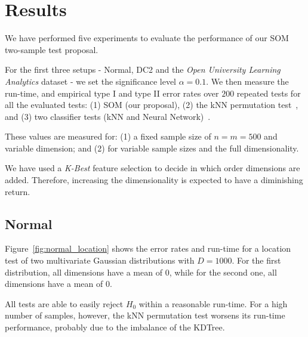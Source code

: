 \section{Results}
\label{sec:som_results}

We have performed five experiments to evaluate the performance of our \gls{SOM} 
two-sample test proposal.

For the first three setups - Normal, DC2 and the \emph{Open University Learning Analytics} dataset
- we set the significance level $\alpha = 0.1$. We then measure the run-time, and empirical 
type I and type II error rates over $200$ repeated tests for all the evaluated
tests: (1) \gls{SOM}  (our proposal), (2) the kNN permutation test~\cite{Schilling1986b},
and (3) two classifier tests (kNN and Neural Network)~\cite{lopez2016revisiting}.

These values are measured for: (1) a fixed sample size of $n = m = 500$ and variable dimension;
and (2) for variable sample sizes and the full dimensionality.

We have used a \emph{K-Best} feature selection to decide in which order dimensions are added.
Therefore, increasing the dimensionality is expected to have a diminishing return.

\subsection{Normal}
Figure~\ref{fig:normal_location} shows the error rates and run-time for a location
test of two multivariate Gaussian distributions with $D=1000$. For the first distribution,
all dimensions have a mean of $0$, while for the second one, all dimensions have a mean of $0$.

All tests are able to easily reject $H_0$ within a reasonable run-time. For
a high number of samples, however, the kNN permutation test worsens its run-time performance,
probably due to the imbalance of the KDTree.

